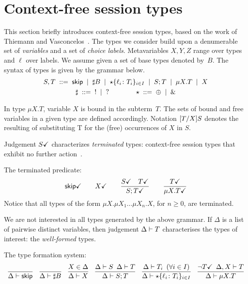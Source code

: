 \section{Context-free session types}
\label{sec:contextfreesession}

This section briefly introduces context-free session types, based on
the work of Thiemann and Vasconcelos~\cite{thiemann2016context}.
%
The types we consider build upon a denumerable set of \emph{variables}
and a set of \emph{choice labels}.  Metavariables $X,Y,Z$ range over
types and $\ell$ over labels.
%
We assume given a set of base types denoted by~$B$.
The syntax of types is given by the grammar below.
%
\begin{gather*}
  S,T \grmeq \skipk \grmor \sharp B \grmor 
  \star\{\ell_i\colon T_i\}_{i\in I} \grmor S;T \grmor \mu X.T \grmor X
  \\
  \sharp \grmeq {}! \grmor {}? 
  \qquad \qquad
  \star  \grmeq \oplus \grmor {}\&
\end{gather*}

In type $\mu X.T$, variable $X$ is bound in the subterm~$T$. The sets
of bound and free variables in a given type are defined
accordingly. Notation $\subs{T}{X}S$ denotes the resulting of
substituting T for the (free) occurrences of $X$ in $S$.

Judgement $\DONE S$ characterizes \emph{terminated} types:
context-free session types that exhibit no further
action~\cite{DBLP:journals/jacm/AcetoH92}.

\noindent The terminated predicate:\hfill{} 
%
\begin{gather*}
  \DONE{\skipk}
  \qquad 
  \DONE X
  \qquad
  \frac{\DONE{S} \quad \DONE{T}}{\DONE{S; T}}
  \qquad
  \frac{\DONE T}{\DONE{\mu X.T}}
\end{gather*}
%
Notice that all types of the form $\mu X. \mu X_1\dots\mu X_n.X$, for
$n\ge0$, are terminated.

We are not interested in all types generated by the above grammar.
%
If $\Delta$ is a list of pairwise distinct variables, then judgement
$\isType T$ characterises the types of interest: the
\emph{well-formed} types.

\noindent The type formation system: \hfill{}
%
\begin{gather*}
  \frac{} 
  {
    \isType \skipk
  }
  \enspace\;
  \frac{}
  {
    \isType {\sharp B}
  }
  \enspace\;
  \frac{
    X \in \Delta
  }{
    \isType{X}
  }
  \enspace\;
  \frac{
    \isType{S}
    \enspace
    \isType{T}
  }{
    \isType{S;T}
  }
  \enspace\;
  \frac{
    \isType{T_i}
    \enspace
    (\forall i\in I)
  }{
    \isType{\star 
      \{ \ell_i \colon T_i\}_{i\in I}}
  }
  \enspace\;
  \frac{
    \neg\DONE T
    \enspace 
    \isType [\Delta, X] T
  }{
    \isType {\mu X. T}
  }
\end{gather*}

